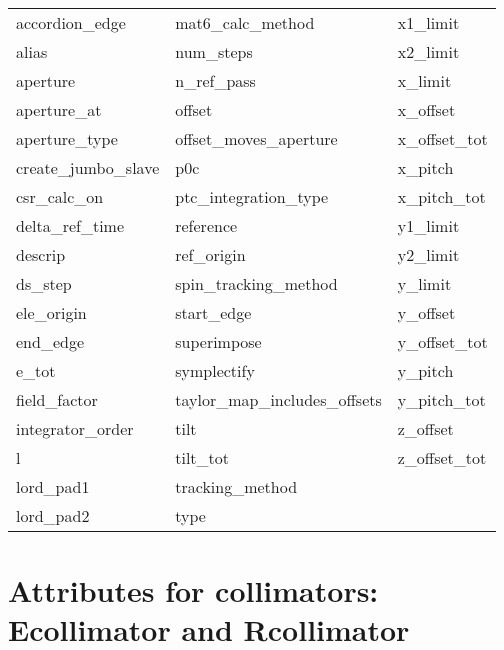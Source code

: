  \begin{tabular}{lll} \toprule
accordion_edge              & mat6_calc_method            & x1_limit                    \\
alias                       & num_steps                   & x2_limit                    \\
aperture                    & n_ref_pass                  & x_limit                     \\
aperture_at                 & offset                      & x_offset                    \\
aperture_type               & offset_moves_aperture       & x_offset_tot                \\
create_jumbo_slave          & p0c                         & x_pitch                     \\
csr_calc_on                 & ptc_integration_type        & x_pitch_tot                 \\
delta_ref_time              & reference                   & y1_limit                    \\
descrip                     & ref_origin                  & y2_limit                    \\
ds_step                     & spin_tracking_method        & y_limit                     \\
ele_origin                  & start_edge                  & y_offset                    \\
end_edge                    & superimpose                 & y_offset_tot                \\
e_tot                       & symplectify                 & y_pitch                     \\
field_factor                & taylor_map_includes_offsets & y_pitch_tot                 \\
integrator_order            & tilt                        & z_offset                    \\
l                           & tilt_tot                    & z_offset_tot                \\
lord_pad1                   & tracking_method             &                             \\
lord_pad2                   & type                        &                             \\
 \bottomrule
 \end{tabular}
 \vfill
 
 \section{Attributes for collimators: Ecollimator and Rcollimator}
 \label{s:list.collimator}
 
